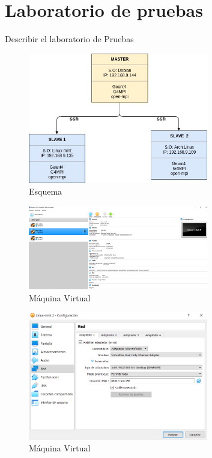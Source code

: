 \section{Laboratorio de pruebas}
Describir el laboratorio de Pruebas

\begin{figure}[H]
    \centering
  \includegraphics[width=0.7\textwidth]{images/esquema.jpg}
  \caption{Esquema}
  \label{esq}
\end{figure}


\begin{figure}[H]
    \centering
  \includegraphics[width=0.7\textwidth]{images/lab1.PNG}
  \caption{Máquina Virtual}
  \label{mv1}
\end{figure}


\begin{figure}[H]
    \centering
  \includegraphics[width=0.7\textwidth]{images/lab2.PNG}
  \caption{Máquina Virtual}
  \label{mv2}
\end{figure}

